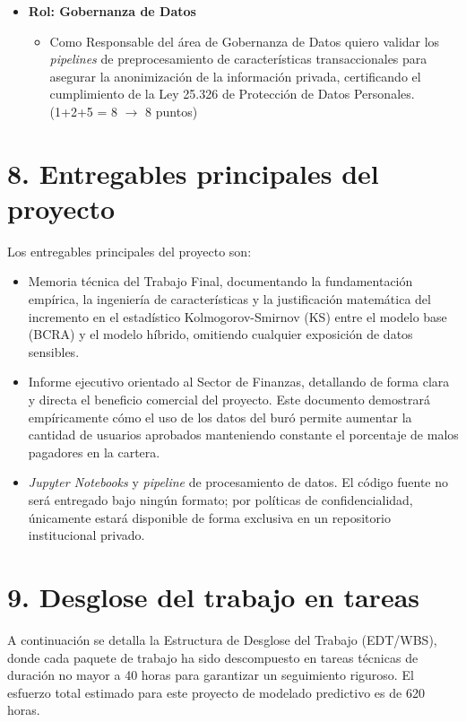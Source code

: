 \documentclass[
11pt, %
]{charter}
\begin{document}
\begin{itemize}
    \item \textbf{Rol: Gobernanza de Datos}
    \begin{itemize}
        \item Como Responsable del área de Gobernanza de Datos quiero validar los \textit{pipelines} de preprocesamiento de características transaccionales para asegurar la anonimización de la información privada, certificando el cumplimiento de la Ley 25.326 de Protección de Datos Personales. (1+2+5 = 8 $\rightarrow$ 8 puntos)
    \end{itemize}

\end{itemize}

\section{8. Entregables principales del proyecto}
\label{sec:entregables}

Los entregables principales del proyecto son:
\begin{itemize}
    \item Memoria técnica del Trabajo Final, documentando la fundamentación empírica, la ingeniería de características y la justificación matemática del incremento en el estadístico Kolmogorov-Smirnov (KS) entre el modelo base (BCRA) y el modelo híbrido, omitiendo cualquier exposición de datos sensibles.
    \item Informe ejecutivo orientado al Sector de Finanzas, detallando de forma clara y directa el beneficio comercial del proyecto. Este documento demostrará empíricamente cómo el uso de los datos del buró permite aumentar la cantidad de usuarios aprobados manteniendo constante el porcentaje de malos pagadores en la cartera.
    \item \textit{Jupyter Notebooks} y \textit{pipeline} de procesamiento de datos. El código fuente no será entregado bajo ningún formato; por políticas de confidencialidad, únicamente estará disponible de forma exclusiva en un repositorio institucional privado.
\end{itemize}

\section{9. Desglose del trabajo en tareas}
\label{sec:wbs}

A continuación se detalla la Estructura de Desglose del Trabajo (EDT/WBS), donde cada paquete de trabajo ha sido descompuesto en tareas técnicas de duración no mayor a 40 horas para garantizar un seguimiento riguroso. El esfuerzo total estimado para este proyecto de modelado predictivo es de 620 horas.
\end{document}
